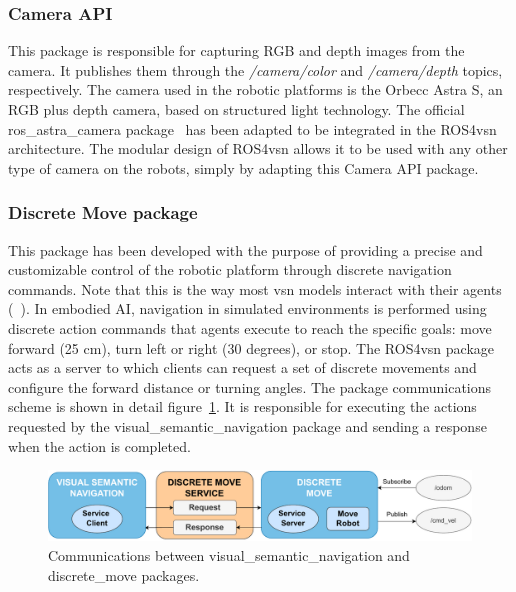 \subsubsection{Camera API}\label{subsubsec:camera-api}

This package is responsible for capturing RGB and depth images from the camera.
It publishes them through the \textit{/camera/color} and \textit{/camera/depth} topics, respectively.
The camera used in the robotic platforms is the Orbecc Astra S, an RGB plus depth camera, based on structured light technology.
The official ros\_astra\_camera package~\cite{orbeccros} has been adapted to be integrated in the ROS4\acrshort{vsn} architecture.
The modular design of ROS4\acrshort{vsn} allows it to be used with any other type of camera on the robots, simply by adapting this Camera API package.

\subsubsection{Discrete Move package}\label{subsubsec:discrete-move-package}

This package has been developed with the purpose of providing a precise and customizable control of the robotic platform through discrete navigation commands.
Note that this is the way most \acrshort{vsn} models interact with their agents (\eg~\cite{ramrakhya2023,chang2020}).
In embodied AI, navigation in simulated environments is performed using discrete action commands that agents execute to reach the specific goals: move forward (25 cm), turn left or right (30 degrees), or stop.
The ROS4\acrshort{vsn} package acts as a server to which clients can request a set of discrete movements and configure the forward distance or turning angles.
The package communications scheme is shown in detail figure~\ref{fig:discrete_move}.
It is responsible for executing the actions requested by the visual\_semantic\_navigation package and sending a response when the action is completed.

\begin{figure}
    \centering
    \includegraphics[width=\linewidth]{figures/ros4vsn/comunicaciones_service}
    \caption{Communications between visual\_semantic\_navigation and discrete\_move packages.}
    \label{fig:discrete_move}
\end{figure}

